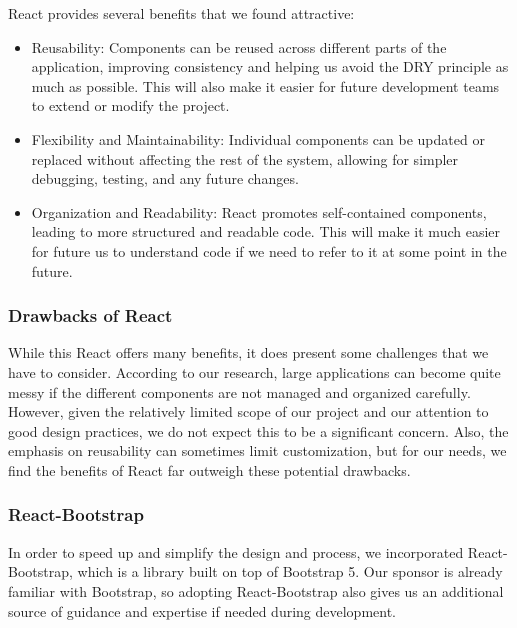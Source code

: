 \documentclass[12pt]{article}
\begin{document}
React provides several benefits that we found attractive:
\begin{itemize}
	\item Reusability: Components can be reused across different parts of the application, improving consistency and helping us avoid the DRY principle as much as possible. This will also make it easier for future development teams to extend or modify the project.
	\item Flexibility and Maintainability: Individual components can be updated or replaced without affecting the rest of the system, allowing for simpler debugging, testing, and any future changes. 
	\item Organization and Readability: React promotes self-contained components, leading to more structured and readable code. This will make it much easier for future us to understand code if we need to refer to it at some point in the future.
\end{itemize}

\subsubsection{Drawbacks of React}
While this React offers many benefits, it does present some challenges that we have to consider. According to our research, large applications can become quite messy if the different components are not managed and organized carefully. However, given the relatively limited scope of our project and our attention to good design practices, we do not expect this to be a significant concern. Also, the emphasis on reusability can sometimes limit customization, but for our needs, we find the benefits of React far outweigh these potential drawbacks.

\subsubsection{React-Bootstrap}
In order to speed up and simplify the design and process, we incorporated React-Bootstrap, which is a library built on top of Bootstrap 5. Our sponsor is already familiar with Bootstrap, so adopting React-Bootstrap also gives us an additional source of guidance and expertise if needed during development.
\end{document}
